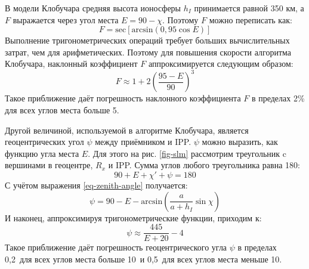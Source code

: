 В модели Клобучара средняя высота ионосферы $h_I$ принимается равной 350 км, а $F$ выражается через угол места $E=90-\chi$.
Поэтому $F$ можно переписать как:
\begin{equation}
F=\text{sec}\left[\text{arcsin}(0,95\cos E)\right]
\end{equation}
Выполнение тригонометрических операций требует больших вычислительных затрат, чем для арифметических.
Поэтому для повышения скорости алгоритма Клобучара, наклонный коэффициент $F$ аппроксимируется следующим образом:
\begin{equation}
F\approx1+2\left(\frac{95-E}{90}\right)^3
\label{eq-slant-factor}
\end{equation}
Такое приближение даёт погрешность наклонного коэффициента $F$ в пределах 2\% для всех углов места больше 5\degree. 

Другой величиной, используемой в алгоритме Клобучара, является геоцентрических угол $\psi$ между приёмником и IPP.
$\psi$ можно  выразить, как функцию угла места $E$.
Для этого на рис. \ref{fig-slm} рассмотрим треугольник c вершинами в геоцентре, $R_x$ и IPP.
Сумма углов любого треугольника равна 180\degree:
\begin{equation}
90+E+\chi'+\psi=180    
\end{equation}
С учётом выражения \eqref{eq-zenith-angle} получается:
\begin{equation}
\psi=90-E-\text{arcsin}\left(\frac{a}{a+h_I}\sin\chi\right)   
\end{equation}
И наконец, аппроксимируя тригонометрические функции, приходим к:
\begin{equation}
\psi\approx\frac{445}{E+20}-4
\label{eq-geocentric angle}
\end{equation}
Такое приближение даёт погрешность геоцентрического угла $\psi$ в пределах 0,2\degree~для всех углов места больше 10\degree~и 0,5\degree~для всех углов места меньше 10\degree.

